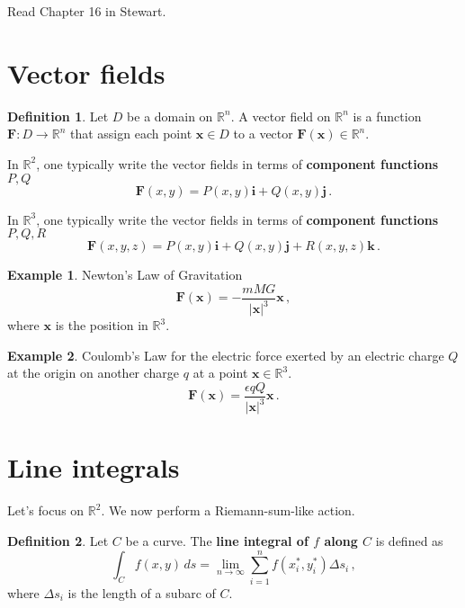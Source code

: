 \documentclass[
]{book}
\theoremstyle{definition}
\newtheorem{definition}{Definition}[chapter]
\theoremstyle{definition}
\newtheorem{example}{Example}[chapter]
\theoremstyle{definition}
\theoremstyle{definition}
\theoremstyle{remark}
\begin{document}
Read Chapter 16 in Stewart.

\hypertarget{vector-fields}{%
\section{Vector fields}\label{vector-fields}}

\begin{definition}
Let \(D\) be a domain on \(\mathbb{R}^n\).
A vector field on \(\mathbb{R}^n\) is a function \(\mathbf{F}: D \to \mathbb{R}^n\)
that assign each point \(\mathbf{x}\in D\) to a vector \(\mathbf{F}(\mathbf{x}) \in \mathbb{R}^n\).
\end{definition}

In \(\mathbb{R}^2\), one typically write the vector fields in terms of \textbf{component functions} \(P, Q\)
\[\mathbf{F}(x,y) = P(x,y) \mathbf{i} + Q(x,y) \mathbf{j}\,.\]

In \(\mathbb{R}^3\), one typically write the vector fields in terms of \textbf{component functions} \(P, Q, R\)
\[\mathbf{F}(x,y,z) = P(x,y) \mathbf{i} + Q(x,y) \mathbf{j} + R(x,y,z) \mathbf{k}\,.\]

\begin{example}
Newton's Law of Gravitation
\begin{equation*}
    \mathbf{F}(\mathbf{x}) = - \frac{m M G}{| \mathbf{x}|^3 } \mathbf{x} \,,
\end{equation*}
where \(\mathbf{x}\) is the position in \(\mathbb{R}^3\).
\end{example}

\begin{example}
Coulomb's Law for the electric force exerted by an electric charge \(Q\)
at the origin on another charge \(q\) at a point \(\mathbf{x}\in \mathbb{R}^3\).
\begin{equation*}
    \mathbf{F}(\mathbf{x}) = \frac{ \epsilon q Q}{|\mathbf{x}|^3} \mathbf{x} \,.
\end{equation*}
\end{example}

\hypertarget{line-integrals}{%
\section{Line integrals}\label{line-integrals}}

Let's focus on \(\mathbb{R}^2\).
We now perform a Riemann-sum-like action.

\begin{definition}
Let \(C\) be a curve.
The \textbf{line integral of \(f\) along \(C\)} is defined as
\begin{equation*}
    \int_C f(x,y) \, ds = \lim_{n\to \infty} \sum_{i=1}^n f(x_i^*, y_i^*) \Delta s_i \,,
\end{equation*}
where \(\Delta s_i\) is the length of a subarc of \(C\).
\end{definition}
\end{document}
